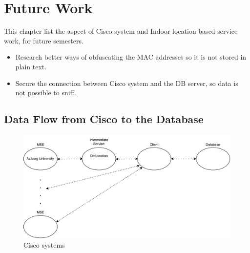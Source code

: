 \chapter{Future Work}
\label{Cha:Future_Work}
This chapter list the aspect of Cisco system and Indoor location based service work, for future semesters.

\begin{itemize}
	\item Research better ways of obfuscating the MAC addresses so it is not stored in plain text.
	\item Secure the connection between Cisco system and the DB server, so data is not possible to sniff.
\end{itemize}


\section{Data Flow from Cisco to the Database}\label{sec:data_flow}
\begin{figure}[ht]
	\begin{center}
		\includegraphics[scale=0.7]{graphics/ciscoNew.pdf}
		\caption{Cisco systems}
		\label{fig:cisco_systems}
	\end{center} 
\end{figure}

